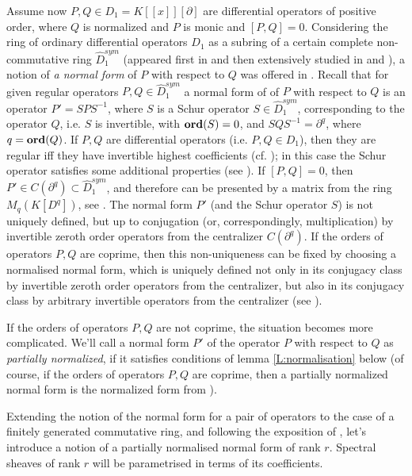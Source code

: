\documentclass[11pt]{article}
\theoremstyle{definition}
\theoremstyle{plain}
\numberwithin{equation}{section}
\newcommand{\Ord}{\mathop {\rm \bf ord}}
\begin{document}
Assume now $P,Q\in D_1=K[[x]][\partial ]$ are differential operators of positive order, where $Q$ is normalized and $P$ is monic and $[P,Q]=0$. Considering the ring of ordinary differential operators $D_1$ as a subring of a certain complete non-commutative ring $\hat{D}_1^{sym}$ (appeared first in \cite{BurbanZheglov2017} and then extensively studied in \cite{A.Z} and \cite{GZ24}), a notion of {\it a normal form} of $P$ with respect to $Q$ was offered in \cite{GZ24}. Recall that for given regular operators $P,Q\in \hat{D}_1^{sym}$ a normal form of of $P$ with respect to $Q$ is an operator  $P'=SPS^{-1}$, where $S$ is a  Schur operator $S\in \hat{D}_1^{sym}$, corresponding to the operator $Q$, i.e. $S$ is invertible, with $\Ord (S)=0$, and $SQS^{-1}=\partial^q$, where $q=\Ord (Q)$. If $P,Q$ are differential operators (i.e. $P,Q\in D_1$), then they are regular iff they have invertible highest coefficients (cf. \cite[Rem. 2.2]{Zheglov25}); in this case the Schur operator satisfies some additional properties (see \cite[\S 2.4]{GZ24}). If $[P,Q]=0$, then $P'\in C(\partial^q)\subset \hat{D}_1^{sym}$, and therefore can be presented by a matrix from the ring $M_q(K[D^q])$, see \cite[\S 3]{GZ24}. The normal form $P'$ (and the Schur operator $S$) is not uniquely defined, but up to conjugation (or, correspondingly, multiplication) by invertible zeroth order operators from the centralizer $C(\partial^q)$. If the orders of operators $P,Q$ are coprime, then this non-uniqueness can be fixed by choosing a normalised normal form, which is uniquely defined not only in its conjugacy class by invertible zeroth order operators from the centralizer, but also in its conjugacy class by arbitrary invertible operators from the centralizer (see \cite[Lem. 3.4]{GZ24}). 

If the orders of operators $P,Q$ are not coprime, the situation becomes more complicated.  We'll call a normal form $P'$ of the operator $P$ with respect to $Q$ as {\it partially normalized}, if it satisfies conditions of lemma \ref{L:normalisation} below (of course, if the orders of operators $P,Q$ are coprime, then a partially normalized normal form is the normalized form from \cite[Lem. 3.4]{GZ24}). 

Extending the notion of the  normal form for a pair of operators to the case of a finitely generated commutative ring, and following the exposition of \cite[\S 3]{GZ24}, let's introduce a notion of a partially normalised normal form of rank $r$. Spectral sheaves of rank $r$ will be parametrised in terms of its coefficients.  
\end{document}
